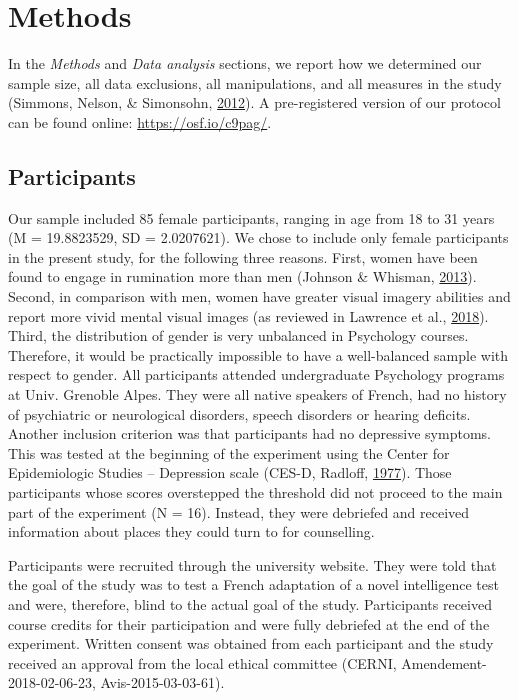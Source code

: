 \documentclass[a4paper,12pt,twoside,openright,oldfontcommands]{memoir}
\begin{document}
\hypertarget{methods-1}{%
\section{Methods}\label{methods-1}}

In the \emph{Methods} and \emph{Data analysis} sections, we report how we determined our sample size, all data exclusions, all manipulations, and all measures in the study (Simmons, Nelson, \& Simonsohn, \protect\hyperlink{ref-simmons_21_2012}{2012}). A pre-registered version of our protocol can be found online: \url{https://osf.io/c9pag/}.

\hypertarget{participants-1}{%
\subsection{Participants}\label{participants-1}}

Our sample included 85 female participants, ranging in age from 18 to 31 years (M = 19.8823529, SD = 2.0207621). We chose to include only female participants in the present study, for the following three reasons. First, women have been found to engage in rumination more than men (Johnson \& Whisman, \protect\hyperlink{ref-Johnson2013}{2013}). Second, in comparison with men, women have greater visual imagery abilities and report more vivid mental visual images (as reviewed in Lawrence et al., \protect\hyperlink{ref-lawrence_visual_2018}{2018}). Third, the distribution of gender is very unbalanced in Psychology courses. Therefore, it would be practically impossible to have a well-balanced sample with respect to gender. All participants attended undergraduate Psychology programs at Univ. Grenoble Alpes. They were all native speakers of French, had no history of psychiatric or neurological disorders, speech disorders or hearing deficits. Another inclusion criterion was that participants had no depressive symptoms. This was tested at the beginning of the experiment using the Center for Epidemiologic Studies -- Depression scale (CES-D, Radloff, \protect\hyperlink{ref-radloff_ces-d_1977}{1977}). Those participants whose scores overstepped the threshold did not proceed to the main part of the experiment (N = 16). Instead, they were debriefed and received information about places they could turn to for counselling.

Participants were recruited through the university website. They were told that the goal of the study was to test a French adaptation of a novel intelligence test and were, therefore, blind to the actual goal of the study. Participants received course credits for their participation and were fully debriefed at the end of the experiment. Written consent was obtained from each participant and the study received an approval from the local ethical committee (CERNI, Amendement-2018-02-06-23, Avis-2015-03-03-61).
\end{document}
